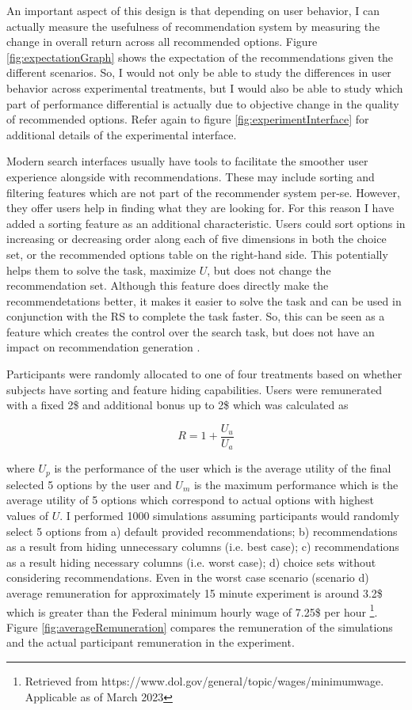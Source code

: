 \documentclass[a4paper,12pt]{article}
\begin{document}
An important aspect of this design is that depending on user behavior, I can actually measure the usefulness of recommendation system by measuring the change in overall return across all recommended options. Figure \ref{fig:expectationGraph} shows the expectation of the recommendations given the different scenarios. So, I would not only be able to study the differences in user behavior across experimental treatments, but I would also be able to study which part of performance differential is actually due to objective change in the quality of recommended options. Refer again to figure \ref{fig:experimentInterface} for additional details of the experimental interface.

Modern search interfaces usually have tools to facilitate the smoother user experience alongside with recommendations. These may include sorting and filtering features which are not part of the recommender system per-se. However, they offer users help in finding what they are looking for. For this reason I have added a sorting feature as an additional characteristic. Users could sort options in increasing or decreasing order along each of five dimensions in both the choice set, or the recommended options table on the right-hand side. This potentially helps them to solve the task, maximize $U$, but does not change the recommendation set. Although this feature does directly make the recommendetations better, it makes it easier to solve the task and can be used in conjunction with the RS to complete the task faster. So, this can be seen as a feature which creates the control over the search task, but does not have an impact on recommendation generation \citep{jannach2017user}. 

Participants were randomly allocated to one of four treatments based on whether subjects have sorting and feature hiding capabilities. Users were remunerated with a fixed 2\$ and additional bonus up to 2\$ which was calculated as 

$$R = 1 + \frac{U_u}{U_a}$$

where $U_p$ is the performance of the user which is the average utility of the final selected 5 options by the user and $U_m$ is the maximum performance which is the average utility of 5 options which correspond to actual options with highest values of $U$. I performed 1000 simulations assuming participants would randomly select 5 options from a) default provided recommendations; b) recommendations as a result from hiding unnecessary columns (i.e. best case); c) recommendations as a result hiding necessary columns (i.e. worst case); d) choice sets without considering recommendations. Even in the worst case scenario (scenario d) average remuneration for approximately 15 minute experiment is around 3.2\$ which is greater than the Federal minimum hourly wage  of 7.25\$ per hour \footnote{Retrieved from https://www.dol.gov/general/topic/wages/minimumwage. Applicable as of March 2023}. Figure \ref{fig:averageRemuneration} compares the remuneration of the simulations and the actual participant remuneration in the experiment.
\end{document}
